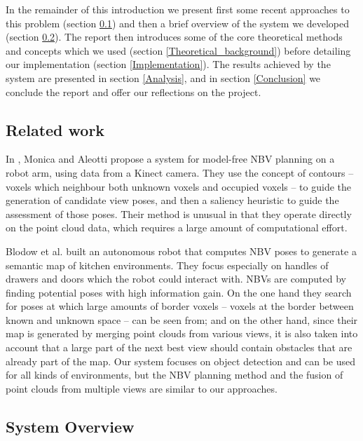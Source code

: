 In the remainder of this introduction we present first some recent approaches to this problem (section \ref{sub:related_work}) and then a brief overview of the system we developed (section \ref{sub:system_overview}).
The report then introduces some of the core theoretical methods and concepts which we used (section \ref{Theoretical_background}) before detailing our implementation (section \ref{Implementation}).
The results achieved by the system are presented in section \ref{Analysis}, and in section \ref{Conclusion} we conclude the report and offer our reflections on the project.

\subsection{Related work}
\label{sub:related_work}

In \cite{monica2017}, Monica and Aleotti propose a system for model-free NBV planning on a robot arm, using data from a Kinect camera.
They use the concept of contours -- voxels which neighbour both unknown voxels and occupied voxels -- to guide the generation of candidate view poses, and then a saliency heuristic to guide the assessment of those poses.
Their method is unusual in that they operate directly on the point cloud data, which requires a large amount of computational effort.

Blodow et al. \cite{blodow2011autonomous} built an autonomous robot that computes NBV poses to generate a semantic map of kitchen environments.
They focus especially on handles of drawers and doors which the robot could interact with.
NBVs are computed by finding potential poses with high information gain. On the one hand they search for poses at which large amounts of border voxels -- voxels at the border between known and unknown space -- can be seen from; and on the other hand, since their map is generated by merging point clouds from various views, it is also taken into account that a large part of the next best view should contain obstacles that are already part of the map.
Our system focuses on object detection and can be used for all kinds of environments, but the NBV planning method and the fusion of point clouds from multiple views are similar to our approaches.

\subsection{System Overview} %
\label{sub:system_overview}

